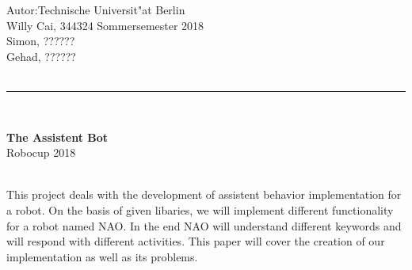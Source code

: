 \documentclass[11pt, a4paper]{article}
\begin{document}

\renewcommand{\footrulewidth}{0,2pt}


\pagestyle{fancy}
\fancyhead[L]{}
\fancyhead[C]{}
\fancyhead[R]{}
\fancyfoot[L]{}
\fancyfoot[R]{}
\fancyfoot[C]{~\\ \thepage}




{\normalsize
\noindent  Autor:\hfill Technische Universit"at Berlin\\
Willy Cai, 344324 \hfill Sommersemester 2018\\
Simon, ?????? \\
Gehad, ?????? \\\\
\hrule
\ \\[5cm]

}

\begin{center}
  \textbf{\LARGE The Assistent Bot} \\[0.4cm] { \Large Robocup 2018}\\[3cm] \

  \begin{minipage}{0.9\textwidth}
  This project deals with the development of assistent behavior implementation for a robot. On the basis of given libaries, we will implement different functionality for a robot named NAO. In the end NAO will understand different keywords and will respond with different activities. This paper will cover the creation of our implementation as well as its problems.
  \end{minipage}
\end{center}
\end{document}
